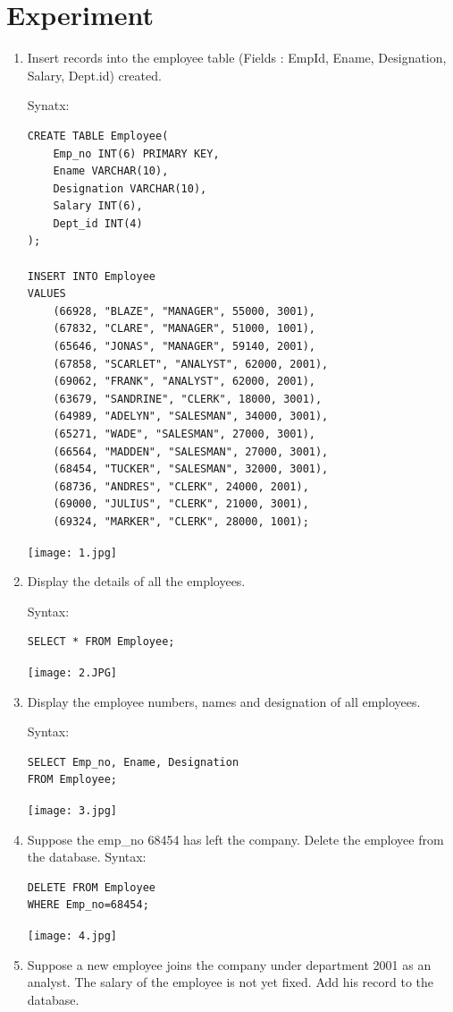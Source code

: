 \documentclass[13pt,oneside]{book}
\begin{document}
\section*{Experiment}
	\begin{enumerate}
		\item 
			Insert records into the employee table (Fields : EmpId, Ename,
Designation, Salary, Dept.id) created.
            
             Synatx:
			\begin{verbatim}
CREATE TABLE Employee(
	Emp_no INT(6) PRIMARY KEY,
	Ename VARCHAR(10),
	Designation VARCHAR(10),
	Salary INT(6),
	Dept_id INT(4)
);

INSERT INTO Employee
VALUES
	(66928, "BLAZE", "MANAGER", 55000, 3001),
	(67832, "CLARE", "MANAGER", 51000, 1001),
	(65646, "JONAS", "MANAGER", 59140, 2001),
	(67858, "SCARLET", "ANALYST", 62000, 2001),
	(69062, "FRANK", "ANALYST", 62000, 2001),
	(63679, "SANDRINE", "CLERK", 18000, 3001),
	(64989, "ADELYN", "SALESMAN", 34000, 3001),
	(65271, "WADE", "SALESMAN", 27000, 3001),
	(66564, "MADDEN", "SALESMAN", 27000, 3001),
	(68454, "TUCKER", "SALESMAN", 32000, 3001),
	(68736, "ANDRES", "CLERK", 24000, 2001),
	(69000, "JULIUS", "CLERK", 21000, 3001),
	(69324, "MARKER", "CLERK", 28000, 1001);
			\end{verbatim}
			\texttt{[image: 1.jpg]}
		
			\item 
			Display the details of all the employees.
			
			Syntax:
			\begin{verbatim}
SELECT * FROM Employee;
			\end{verbatim}
			\texttt{[image: 2.JPG]}
		
		\item 
		Display the employee numbers, names and designation of all employees.
		
		Syntax:
		\begin{verbatim}
SELECT Emp_no, Ename, Designation
FROM Employee;
		\end{verbatim}
		\texttt{[image: 3.jpg]}

		\item
		Suppose the emp\_no 68454 has left the company. Delete the employee
from the database.
		Syntax: 
		\begin{verbatim}
DELETE FROM Employee
WHERE Emp_no=68454;
		\end{verbatim}
	\texttt{[image: 4.jpg]}
    
    \item
    Suppose a new employee joins the company under department 2001 as
an analyst. The salary of the employee is not yet fixed. Add his record to
the database.


\end{enumerate}
\end{document}
